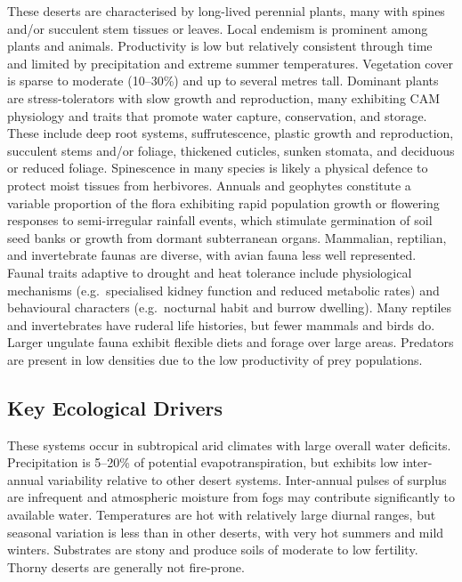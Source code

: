 \documentclass[
  letterpaper,
  DIV=11,
  numbers=noendperiod]{scrartcl}
\begin{document}
These deserts are characterised by long-lived perennial plants, many
with spines and/or succulent stem tissues or leaves. Local endemism is
prominent among plants and animals. Productivity is low but relatively
consistent through time and limited by precipitation and extreme summer
temperatures. Vegetation cover is sparse to moderate (10--30\%) and up
to several metres tall. Dominant plants are stress-tolerators with slow
growth and reproduction, many exhibiting CAM physiology and traits that
promote water capture, conservation, and storage. These include deep
root systems, suffrutescence, plastic growth and reproduction, succulent
stems and/or foliage, thickened cuticles, sunken stomata, and deciduous
or reduced foliage. Spinescence in many species is likely a physical
defence to protect moist tissues from herbivores. Annuals and geophytes
constitute a variable proportion of the flora exhibiting rapid
population growth or flowering responses to semi-irregular rainfall
events, which stimulate germination of soil seed banks or growth from
dormant subterranean organs. Mammalian, reptilian, and invertebrate
faunas are diverse, with avian fauna less well represented. Faunal
traits adaptive to drought and heat tolerance include physiological
mechanisms (e.g.~specialised kidney function and reduced metabolic
rates) and behavioural characters (e.g.~nocturnal habit and burrow
dwelling). Many reptiles and invertebrates have ruderal life histories,
but fewer mammals and birds do. Larger ungulate fauna exhibit flexible
diets and forage over large areas. Predators are present in low
densities due to the low productivity of prey populations.

\subsection{Key Ecological Drivers}\label{key-ecological-drivers-89}

These systems occur in subtropical arid climates with large overall
water deficits. Precipitation is 5--20\% of potential
evapotranspiration, but exhibits low inter-annual variability relative
to other desert systems. Inter-annual pulses of surplus are infrequent
and atmospheric moisture from fogs may contribute significantly to
available water. Temperatures are hot with relatively large diurnal
ranges, but seasonal variation is less than in other deserts, with very
hot summers and mild winters. Substrates are stony and produce soils of
moderate to low fertility. Thorny deserts are generally not fire-prone.
\end{document}
